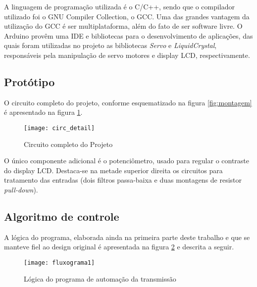 \documentclass[a4paper,11pt]{article}
\begin{document}
A linguagem de programação utilizada é o C/C++, sendo que o compilador
utilizado foi o GNU Compiler Collection, o GCC\cite{gcc}. Uma das grandes
vantagem da utilização do GCC é ser multiplataforma, além do fato de ser
software livre. O Arduino provêm uma IDE e bibliotecas para o desenvolvimento
de aplicações, das quais foram utilizadas no projeto as bibliotecas
\textit{Servo} e \textit{LiquidCrystal}, responsáveis pela manipulação de servo
motores e display LCD, respectivamente.


%
\subsection{Protótipo}
\label{sec:prototipo}
O circuito completo do projeto, conforme esquematizado na figura
\ref{fig:montagem} é apresentado na figura \ref{fig:circuito}.
\begin{figure}[h]
\begin{center}
 \texttt{[image: circ\_detail]}
\end{center}
  \caption{Circuito completo do Projeto}
  \label{fig:circuito}
\end{figure}
O único componente adicional é o potenciômetro, usado para regular o contraste
do display LCD. Destaca-se na metade superior direita os circuitos para
tratamento das entradas (dois filtros passa-baixa e duas montagens de resistor
\textit{pull-down}).

%

\subsection{Algoritmo de controle}
\label{sec:software}
A lógica do programa, elaborada ainda na primeira parte deste trabalho e que se
manteve fiel ao design original é apresentada na figura \ref{fig:fluxograma1} e
descrita a seguir.

\begin{figure}[hb!]
 \begin{center}
  \texttt{[image: fluxograma1]}
 \end{center}
 \caption{Lógica do programa de automação da transmissão}
 \label{fig:fluxograma1}
\end{figure}
\end{document}
